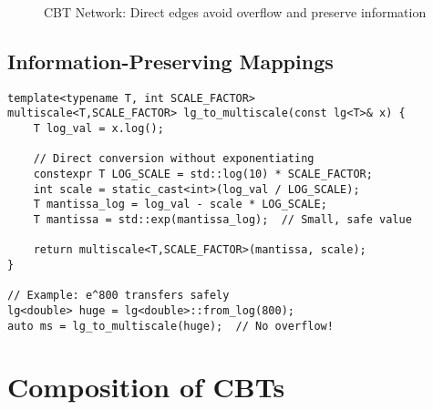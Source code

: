 \documentclass[12pt,a4paper]{article}
\theoremstyle{definition}
\begin{document}
\begin{figure}[h]
\centering
{}
\caption{CBT Network: Direct edges avoid overflow and preserve information}
\end{figure}

\subsection{Information-Preserving Mappings}

\begin{lstlisting}[caption={Direct lg to multiscale mapping}]
template<typename T, int SCALE_FACTOR>
multiscale<T,SCALE_FACTOR> lg_to_multiscale(const lg<T>& x) {
    T log_val = x.log();
    
    // Direct conversion without exponentiating
    constexpr T LOG_SCALE = std::log(10) * SCALE_FACTOR;
    int scale = static_cast<int>(log_val / LOG_SCALE);
    T mantissa_log = log_val - scale * LOG_SCALE;
    T mantissa = std::exp(mantissa_log);  // Small, safe value
    
    return multiscale<T,SCALE_FACTOR>(mantissa, scale);
}

// Example: e^800 transfers safely
lg<double> huge = lg<double>::from_log(800);
auto ms = lg_to_multiscale(huge);  // No overflow!
\end{lstlisting}

\section{Composition of CBTs}
\end{document}
